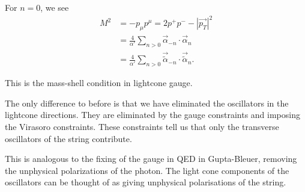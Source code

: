 For $n = 0$, we see
\begin{align}
    M^2 &= - p_\mu p^{\mu} = 2p^{+} p^{-} - \left| \vec{p_T} \right|^2  \\
    &= \frac{4}{\alpha'} \sum_{n > 0}^{} \vec{\alpha}_{-n} \cdot \vec{\alpha}_{n} \\
    &= \frac{4}{\alpha'} \sum_{n > 0}^{} \vec{\widetilde{\alpha}}_{-n} \cdot \vec{\widetilde{\alpha}}_n 
.\end{align}

This is the mass-shell condition in lightcone gauge.

The only difference to before is that we have eliminated the oscillators in the lightcone directions. They are eliminated by the gauge constraints and imposing the Virasoro constraints. These constraints tell us that only the transverse oscillators of the string contribute.

This is analogous to the fixing of the gauge in QED in Gupta-Bleuer, removing the unphysical polarizations of the photon. The light cone components of the oscillators can be thought of as giving unphysical polarisations of the string.


